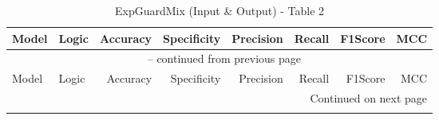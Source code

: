 \documentclass{article}
\begin{document}

{\small
\begin{longtable}{llrrrrrr}
\caption{ExpGuardMix (Input \& Output) - Table 2} \label{tab:5models} \\
 
\toprule
Model & Logic & Accuracy & Specificity & Precision & Recall & F1Score & MCC \\
\midrule
\endfirsthead
 
\multicolumn{8}{c}{\tablename\ \thetable{} -- continued from previous page} \\
\toprule
Model & Logic & Accuracy & Specificity & Precision & Recall & F1Score & MCC \\
\midrule
\endhead
 
\midrule
\multicolumn{8}{r}{Continued on next page} \\
\endfoot
 
\bottomrule
\endlastfoot


\end{longtable}}
\end{document}

